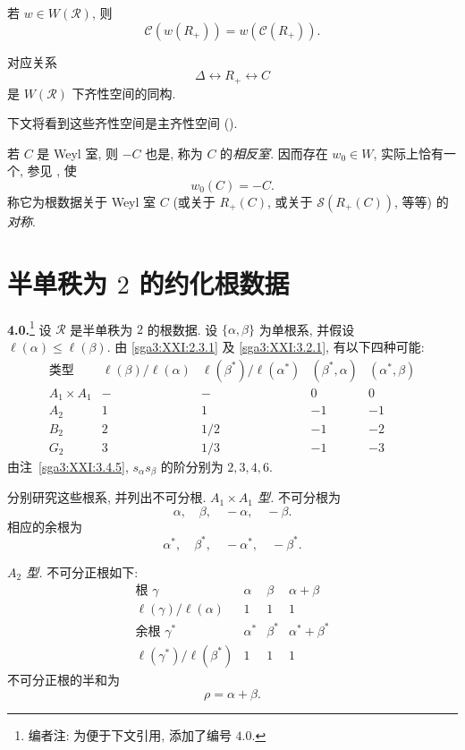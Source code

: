\begin{lemma}\label{sga3:XXI:3.6.12}
若 \(w\in W(\mathcal{R})\), 则
\[
 \mathcal{C}(w(R_+))=w(\mathcal{C}(R_+)).
\]
\end{lemma}

\begin{corollary}\label{sga3:XXI:3.6.13}
对应关系
\[
 \Delta\longleftrightarrow R_+\longleftrightarrow C
\]
是 \(W(\mathcal{R})\) 下齐性空间的同构.
\end{corollary}
下文将看到这些齐性空间是主齐性空间 ().

\begin{remark}\label{sga3:XXI:3.6.14}
若 \(C\) 是 Weyl 室, 则 \(-C\) 也是, 称为 \(C\) 的\emph{相反室}. 因而存在 \(w_0\in W\), 实际上恰有一个, 参见 , 使
\[
 w_0(C)=-C.
\]
称它为根数据关于 Weyl 室 \(C\) (或关于 \(R_+(C)\), 或关于 \(\mathscr{S}(R_+(C))\), 等等) 的\emph{对称}.
\end{remark}

\section{半单秩为 \texorpdfstring{\(2\)}{2} 的约化根数据}
\label{sga3:XXI:4}
\renewcommand{\thetheorem}{\thesection.\arabic{theorem}}
\setcounter{theorem}{0}
\noindent\textbf{4.0.}\footnote{编者注: 为便于下文引用, 添加了编号 \(4.0\).}
设 \(\mathcal{R}\) 是半单秩为 \(2\) 的根数据. 设 \(\{\alpha,\beta\}\) 为单根系, 并假设 \(\ell(\alpha)\le\ell(\beta)\). 由 \ref{sga3:XXI:2.3.1} 及 \ref{sga3:XXI:3.2.1}, 有以下四种可能:
\[
\begin{array}{c|c|c|c|c}
\text{类型}
 &\ell(\beta)/\ell(\alpha)
 &\ell(\beta^\ast)/\ell(\alpha^\ast)
 &(\beta^\ast,\alpha)
 &(\alpha^\ast,\beta)\\ \hline
A_1\times A_1&-&-&0&0\\
A_2&1&1&-1&-1\\
B_2&2&1/2&-1&-2\\
G_2&3&1/3&-1&-3
\end{array}
\]
由注~\ref{sga3:XXI:3.4.5}, \(s_\alpha s_\beta\) 的阶分别为 \(2,3,4,6\).

分别研究这些根系, 并列出不可分根.
\medskip
\noindent\emph{\(A_1\times A_1\) 型.}
不可分根为
\[
 \alpha,\quad\beta,\quad-\alpha,\quad-\beta.
\]
相应的余根为
\[
 \alpha^\ast,\quad\beta^\ast,\quad-\alpha^\ast,\quad-\beta^\ast.
\]

\medskip
\noindent\emph{\(A_2\) 型.}
不可分正根如下:
\[
\begin{array}{c|ccc}
\text{根 }\gamma
 &\alpha&\beta&\alpha+\beta\\ \hline
\ell(\gamma)/\ell(\alpha)
 &1&1&1\\ \hline
\text{余根 }\gamma^\ast
 &\alpha^\ast&\beta^\ast&\alpha^\ast+\beta^\ast\\ \hline
\ell(\gamma^\ast)/\ell(\beta^\ast)
 &1&1&1
\end{array}
\]
不可分正根的半和为
\[
 \rho=\alpha+\beta.
\]

